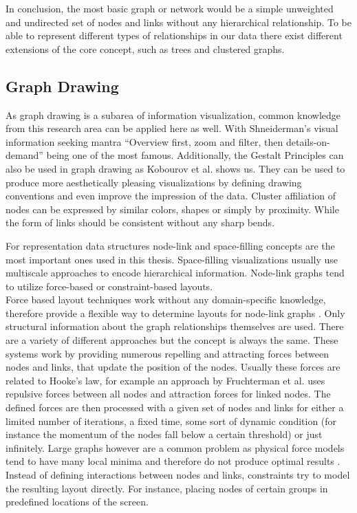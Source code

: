 In conclusion, the most basic graph or network would be a simple unweighted and undirected set of nodes and links without any hierarchical relationship. To be able to represent different types of relationships in our data there exist different extensions of the core concept, such as trees and clustered graphs. 

\subsection{Graph Drawing}

As graph drawing is a subarea of information visualization, common knowledge from this research area can be applied here as well. With Shneiderman's visual information seeking mantra \label{seeking mantra} “Overview first, zoom and filter, then details-on-demand” \cite{shneiderman_eyes_1996} being one of the most famous. Additionally, the Gestalt Principles can also be used in graph drawing as Kobourov et al.
\cite{kobourov_gestalt_2015} shows us. They can be used to produce more aesthetically pleasing visualizations by defining drawing conventions and even improve the impression of the data. Cluster affiliation of nodes can be expressed by similar colors, shapes or simply by proximity. While the form of links should be consistent without any sharp bends.

For representation data structures node-link and space-filling concepts are the most important ones used in this thesis. Space-filling visualizations usually use multiscale approaches to encode hierarchical information. Node-link graphs tend to utilize force-based or constraint-based layouts\cite{von_landesberger_visual_2011}.\\
Force based\label{exp:force_based_background} layout techniques work without any domain-specific knowledge, therefore provide a flexible way to determine layouts for node-link graphs \cite{kobourov_spring_2012}. Only structural information about the graph relationships themselves are used. 
There are a variety of different approaches but the concept is always the same. 
These systems work by providing numerous repelling and attracting forces between nodes and links, that update the position of the nodes. Usually these forces are related to Hooke's law, for example an approach by Fruchterman et al. \cite{fruchterman_graph_1991} uses repulsive forces between all nodes and attraction forces for linked nodes.
The defined forces are then processed with a given set of nodes and links for either a limited number of iterations, a fixed time, some sort of dynamic condition (for instance the momentum of the nodes fall below a certain threshold) or just infinitely.
Large graphs however are a common problem as physical force models tend to have many local minima and therefore do not produce optimal results \cite{kobourov_spring_2012}.\\
Instead of defining interactions between nodes and links, constraints try to model the resulting layout directly. For instance, placing nodes of certain groups in predefined locations of the screen.   

